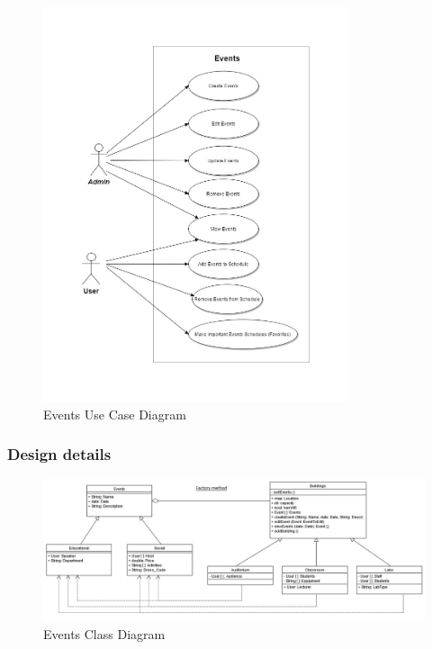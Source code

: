 \documentclass{article}
\begin{document}
    \begin{figure}[h!]
        \includegraphics[width=0.8\textwidth]{EventUC.jpg}
        \caption{Events Use Case Diagram}
    \end{figure}
 
\clearpage

\subsubsection{Design details}
   
    \begin{figure}[h!]
      \includegraphics[width=\textwidth]{ClassDiagramEvents.png}
      \caption{Events Class Diagram}
    \end{figure}
    
\end{document}
